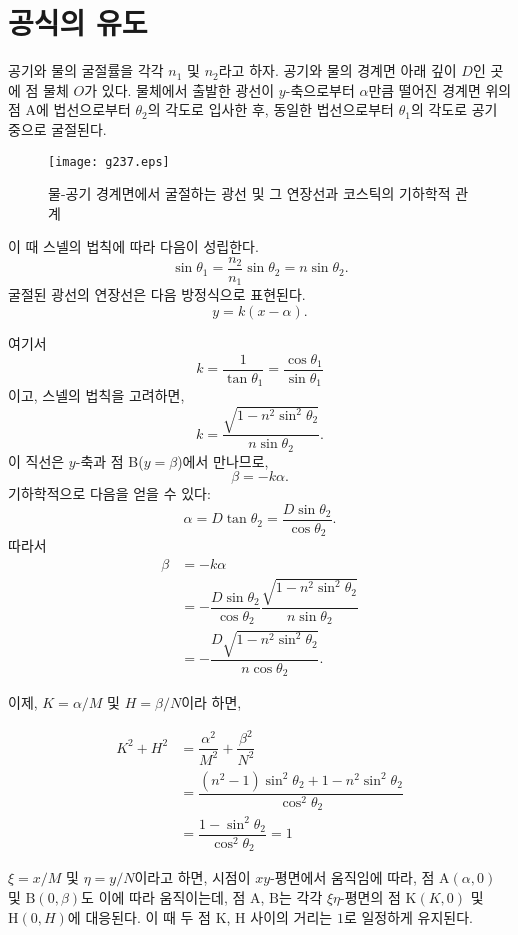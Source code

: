 \documentclass[twocolumn]{article}
\begin{document}
\section{공식의 유도}
	
공기와 물의 굴절률을 각각 $n_1$ 및 $n_2$라고 하자. 공기와 물의 경계면 아래 깊이 $D$인 곳에 점 물체 $O$가 있다. 
물체에서 출발한 광선이 $y$-축으로부터 $\alpha$만큼 떨어진 경계면 위의 점 A에 
법선으로부터 $\theta_2$의 각도로 입사한 후, 동일한 법선으로부터 $\theta_1$의 각도로 공기 중으로 굴절된다.

\begin{figure}
	\centering
	\texttt{[image: g237.eps]}
	\caption{물-공기 경계면에서 굴절하는 광선 및 그 연장선과 코스틱의 기하학적 관계}
	\label{fig:geometry}
\end{figure}


이 때 스넬의 법칙에 따라 다음이 성립한다.
$$ \sin\theta_1 = \frac{n_2}{n_1} \sin\theta_2 = n\sin\theta_2.$$
굴절된 광선의 연장선은 다음 방정식으로 표현된다.
$$y=k(x-\alpha).$$

여기서 
$$k=\dfrac{1}{\tan\theta_1}=\dfrac{\cos\theta_1}{\sin\theta_1}$$
이고, 스넬의 법칙을 고려하면,
$$k=\dfrac{\sqrt{1-n^2\sin^2\theta_2}}{n\sin\theta_2}.$$
이 직선은 $y$-축과 점 B($y=\beta$)에서 만나므로,
$$\beta = -k\alpha.$$
기하학적으로 다음을 얻을 수 있다:
$$\alpha = D\tan\theta_2 = \dfrac{D\sin\theta_2}{\cos\theta_2}.$$
따라서
$$\begin{aligned}
	\beta &= -k\alpha \\
	&= -\dfrac{D\sin\theta_2}{\cos\theta_2}
	\dfrac{\sqrt{1-n^2\sin^2\theta_2}}{n\sin\theta_2}\\
	&=-\dfrac{D\sqrt{1-n^2\sin^2\theta_2}}{n\cos\theta_2}.
\end{aligned}$$

이제, $K=\alpha/M$ 및 $H=\beta/N$이라 하면,

$$ \begin{aligned}
	K^2 + H^2 &= \dfrac{\alpha^2}{M^2}+\dfrac{\beta^2}{N^2}\\
	&=\dfrac{\left(n^2-1\right)\sin^2\theta_2 + 1-n^2\sin^2\theta_2}
	{\cos^2\theta_2}\\
	&=\dfrac{1-\sin^2\theta_2}{\cos^2\theta_2}=1
\end{aligned}$$

$\xi=x/M$ 및 $\eta=y/N$이라고 하면, 시점이 $xy$-평면에서 움직임에 따라,
점 $\mathrm{A}(\alpha, 0)$ 및 $\mathrm{B}(0, \beta)$도 이에 따라 움직이는데, 
점  $\mathrm{A}$, $\mathrm{B}$는 각각  $\xi\eta$-평면의 점 $\mathrm{K}(K, 0)$
및 $\mathrm{H}(0, H)$에 대응된다. 이 때 두 점 $\mathrm{K}$, $\mathrm{H}$ 사이의 
거리는 $1$로 일정하게 유지된다.
\end{document}
